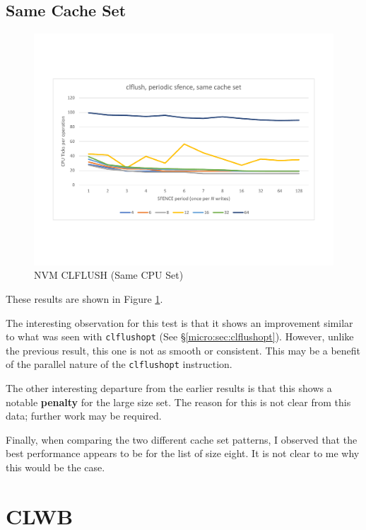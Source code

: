 \subsection{Same Cache Set}

\begin{figure}
    \centering
    \caption{NVM CLFLUSH (Same CPU Set)}\label{micro:clflush:same}
    \includegraphics[scale=0.35]{micro/nvm-clflush-periodic-same.pdf}
\end{figure}

These results are shown in Figure \ref{micro:clflush:same}.

The interesting observation for this test is that it shows an improvement similar to what was seen with \texttt{clflushopt} (See \S \ref{micro:sec:clflushopt}).  However, unlike the
previous result, this one is not as smooth or consistent. This
may be a benefit of the parallel nature of the \texttt{clflushopt} instruction.

The other interesting departure from the earlier results is that
this shows a notable \textbf{penalty} for the large size set.
The reason for this is not clear from this data; further work
may be required.

Finally, when comparing the two different cache set patterns, I
observed that the best performance appears to be for the list
of size eight. It is not clear to me why this would be the case.

\section{CLWB}\label{micro:sec:clwb}

